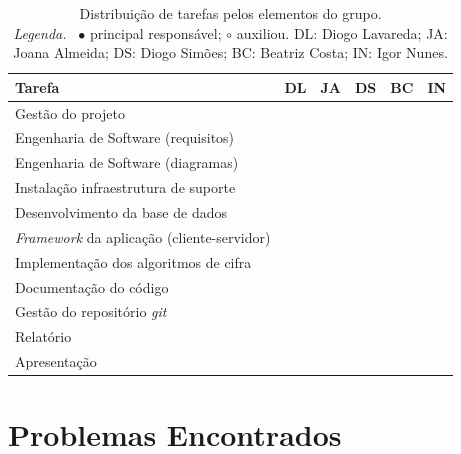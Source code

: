 \begin{table}[!htbp]
	\centering
	\begin{tabular}{l c c c c c}
		\toprule
		\textbf{Tarefa}                             & \textbf{DL} & \textbf{JA} & \textbf{DS} & \textbf{BC} & \textbf{IN} \\
		\midrule
		Gestão do projeto                           &             &             &             &              &            \\
		Engenharia de Software (requisitos)         &             &             &             &              &             \\
		Engenharia de Software (diagramas)          &             &             &             &              &             \\
		Instalação infraestrutura de suporte        &             &             &             &              &            \\
	    Desenvolvimento da base de dados            &             &             &             &              &            \\
		\textit{Framework} da aplicação (cliente-servidor)   &             &             &             &              &            \\
		Implementação dos algoritmos de cifra       &             &             &             &              &            \\
		Documentação do código                      &             &             &             &              &             \\
		Gestão do repositório \textit{git}          &             &             &             &              &              \\
		Relatório                                   &             &             &             &              &             \\
		Apresentação                                &             &             &             &              &              \\
		\bottomrule
	\end{tabular}
	\caption[Distribuição de tarefas]{
		Distribuição de tarefas pelos elementos do grupo.\\
		\textit{Legenda.}~%
		$\bullet$ principal responsável; $\circ$ auxiliou.
		DL: Diogo Lavareda; JA: Joana Almeida; DS: Diogo Simões; BC: Beatriz Costa; IN: Igor Nunes.
	}
	\label{tab::divisao-trabalho}
\end{table}

\section{Problemas Encontrados}
\label{chap4:sec:problemas}

